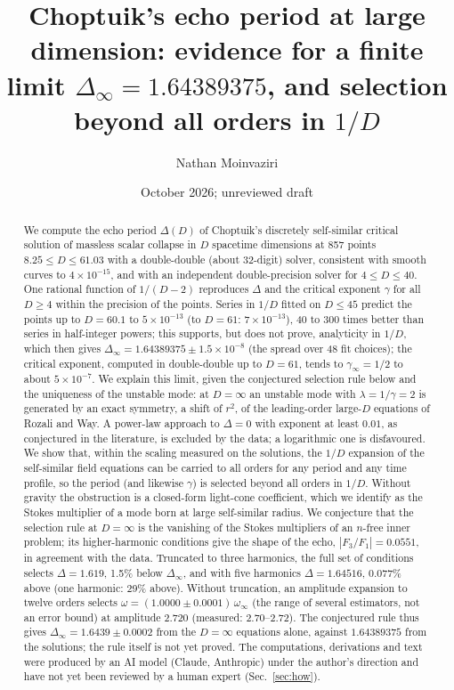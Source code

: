 \documentclass[aps,prd,onecolumn,superscriptaddress,nofootinbib,10pt]{revtex4-2}
\newcommand{\Dinf}{\Delta_\infty}
\begin{document}
\title{Choptuik's echo period at large dimension: evidence for a finite limit
$\Delta_\infty = 1.64389375$, and selection beyond all orders in $1/D$}

\author{Nathan Moinvaziri}
\date{October 2026; unreviewed draft}

\begin{abstract}
We compute the echo period $\Delta(D)$ of Choptuik's discretely self-similar critical solution of massless scalar
collapse in $D$ spacetime dimensions at 857 points $8.25 \le D \le 61.03$ with a double-double (about 32-digit)
solver, consistent with smooth curves to $4\times10^{-15}$, and with an independent double-precision solver for
$4 \le D \le 40$. One rational function of $1/(D-2)$ reproduces $\Delta$ and the critical exponent $\gamma$ for all
$D \ge 4$ within the precision of the points. Series in $1/D$ fitted on $D \le 45$ predict the points up to $D = 60.1$ to
$5\times10^{-13}$ (to $D = 61$: $7\times10^{-13}$), 40 to 300 times better than series in half-integer powers; this supports, but does not prove,
analyticity in $1/D$, which then gives $\Dinf = 1.64389375 \pm 1.5\times10^{-8}$ (the spread over 48 fit choices); the
critical exponent, computed in double-double up to $D = 61$, tends to $\gamma_\infty = 1/2$ to about $5\times10^{-7}$. We explain
this limit, given the conjectured selection rule below and the uniqueness of the unstable mode: at $D = \infty$ an unstable
mode with $\lambda = 1/\gamma = 2$ is generated by an exact symmetry, a shift of $r^2$, of the leading-order large-$D$
equations of Rozali and Way. A power-law approach to $\Delta = 0$ with exponent at least $0.01$, as conjectured in the
literature, is excluded by the data; a logarithmic one is disfavoured. We show that, within the scaling measured on the
solutions, the $1/D$ expansion of the self-similar field equations can be carried to all orders for any period and any
time profile, so the period (and likewise $\gamma$) is selected beyond all orders in $1/D$. Without gravity the obstruction is a
closed-form light-cone coefficient, which we identify as the Stokes multiplier of a mode born at large self-similar
radius. We conjecture that the selection rule at $D = \infty$ is the vanishing of the Stokes multipliers of an
$n$-free inner problem; its higher-harmonic conditions give the shape of the echo, $|F_3/F_1| = 0.0551$, in agreement
with the data. Truncated to three harmonics, the full set of conditions selects $\Delta = 1.619$, 1.5\% below
$\Dinf$, and with five harmonics $\Delta = 1.64516$, 0.077\% above (one harmonic: 29\% above).
Without truncation, an amplitude expansion to twelve orders selects $\omega = (1.0000 \pm 0.0001)\,\omega_\infty$ (the
range of several estimators, not an error bound) at
amplitude 2.720 (measured: 2.70--2.72). The conjectured rule thus gives $\Dinf = 1.6439 \pm 0.0002$ from the
$D = \infty$ equations alone, against $1.64389375$ from the solutions; the rule itself is not yet proved.
The computations, derivations and text were produced by an AI model (Claude, Anthropic) under the author's
direction and have not yet been reviewed by a human expert (Sec.~\ref{sec:how}).
\end{abstract}
\end{document}
